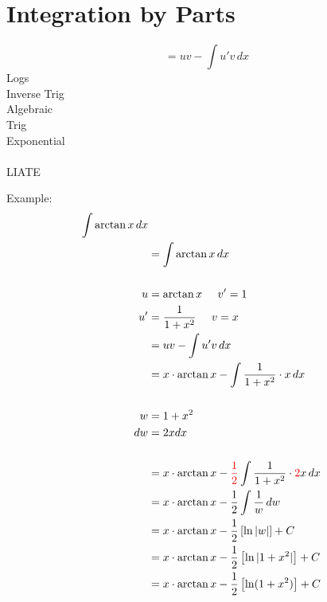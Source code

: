 \section{Integration by Parts}

\begin{framed}
\begin{equation*}
  = uv - \int u'v \, dx
\end{equation*}
Logs\\
Inverse Trig\\
Algebraic\\
Trig\\
Exponential\\\\
LIATE
\end{framed}

\begin{framed}
  Example:
\begin{align*}
  \int \arctan x \, dx\\
  &= \int \arctan x \, dx\\\\
  u &= \arctan x \; \; \; \; \; v' = 1\\
  u' &= \frac{1}{1+x^2} \; \; \; \; \; v = x\\
  &= uv - \int u'v \, dx\\
  &= x \cdot \arctan x - \int \frac{1}{1+x^2} \cdot x \, dx\\\\
  w &= 1+x^2\\
  dw &= 2xdx\\\\
  &= x \cdot \arctan x - \textcolor{red}{\frac{1}{2}}\int \frac{1}{1+x^2} \cdot \textcolor{red}{2} x \, dx\\
  &= x \cdot \arctan x - \frac{1}{2} \int \frac{1}{w} \, dw\\
  &= x \cdot \arctan x - \frac{1}{2} \left[\ln |w|\right] + C\\
  &= x \cdot \arctan x - \frac{1}{2} \left[\ln |1+x^2|\right] + C\\
  &= x \cdot \arctan x - \frac{1}{2} \left[\ln (1+x^2)\right] + C
\end{align*}
\end{framed}